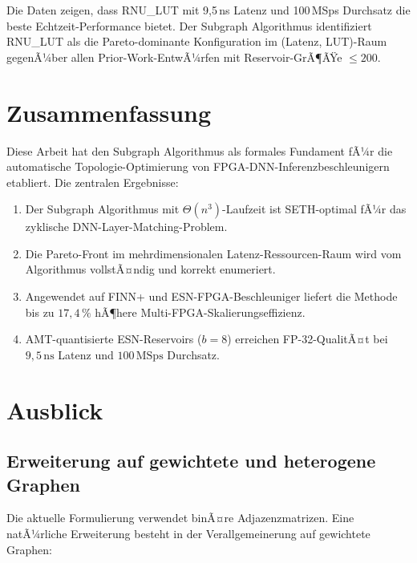 ﻿\documentclass[a4paper,12pt]{article}
\theoremstyle{definition}
\begin{document}
Die Daten zeigen, dass RNU\_LUT mit 9,5\,ns Latenz und 100\,MSps Durchsatz die beste
Echtzeit-Performance bietet. Der Subgraph Algorithmus identifiziert RNU\_LUT als
die Pareto-dominante Konfiguration im (Latenz, LUT)-Raum gegenÃ¼ber allen Prior-Work-EntwÃ¼rfen
mit Reservoir-GrÃ¶ÃŸe $\leq 200$.

\section{Zusammenfassung}
\label{sec:zusammenfassung}

Diese Arbeit hat den Subgraph Algorithmus als formales Fundament fÃ¼r die automatische
Topologie-Optimierung von FPGA-DNN-Inferenzbeschleunigern etabliert.
Die zentralen Ergebnisse:

\begin{enumerate}
    \item Der Subgraph Algorithmus mit $\Theta(n^3)$-Laufzeit ist SETH-optimal fÃ¼r
          das zyklische DNN-Layer-Matching-Problem.
    \item Die Pareto-Front im mehrdimensionalen Latenz-Ressourcen-Raum wird vom
          Algorithmus vollstÃ¤ndig und korrekt enumeriert.
    \item Angewendet auf FINN+ und ESN-FPGA-Beschleuniger liefert die Methode
          bis zu $17{,}4\,\%$ hÃ¶here Multi-FPGA-Skalierungseffizienz.
    \item AMT-quantisierte ESN-Reservoirs ($b=8$) erreichen FP-32-QualitÃ¤t bei
          $9{,}5\,\text{ns}$ Latenz und $100\,\text{MSps}$ Durchsatz.
\end{enumerate}

\section{Ausblick}
\label{sec:ausblick}

\subsection{Erweiterung auf gewichtete und heterogene Graphen}

Die aktuelle Formulierung verwendet binÃ¤re Adjazenzmatrizen. Eine natÃ¼rliche Erweiterung
besteht in der Verallgemeinerung auf gewichtete Graphen:
\end{document}
